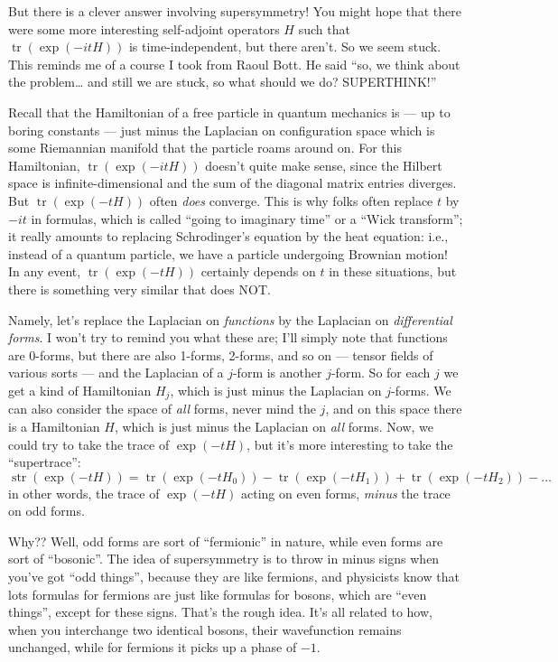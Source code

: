 \documentclass{article}
\begin{document}
But there is a clever answer involving supersymmetry! You might hope
that there were some more interesting self-adjoint operators \(H\) such
that \(\operatorname{tr}(\exp(-itH))\) is time-independent, but there
aren't. So we seem stuck. This reminds me of a course I took from Raoul
Bott. He said ``so, we think about the problem\ldots{} and still we are
stuck, so what should we do? SUPERTHINK!''

Recall that the Hamiltonian of a free particle in quantum mechanics is
--- up to boring constants --- just minus the Laplacian on configuration
space which is some Riemannian manifold that the particle roams around
on. For this Hamiltonian, \(\operatorname{tr}(\exp(-itH))\) doesn't
quite make sense, since the Hilbert space is infinite-dimensional and
the sum of the diagonal matrix entries diverges. But
\(\operatorname{tr}(\exp(-tH))\) often \emph{does} converge. This is why
folks often replace \(t\) by \(-it\) in formulas, which is called
``going to imaginary time'' or a ``Wick transform''; it really amounts
to replacing Schrodinger's equation by the heat equation: i.e., instead
of a quantum particle, we have a particle undergoing Brownian motion! In
any event, \(\operatorname{tr}(\exp(-tH))\) certainly depends on \(t\)
in these situations, but there is something very similar that does NOT.

Namely, let's replace the Laplacian on \emph{functions} by the Laplacian
on \emph{differential forms}. I won't try to remind you what these are;
I'll simply note that functions are 0-forms, but there are also 1-forms,
2-forms, and so on --- tensor fields of various sorts --- and the
Laplacian of a \(j\)-form is another \(j\)-form. So for each \(j\) we
get a kind of Hamiltonian \(H_j\), which is just minus the Laplacian on
\(j\)-forms. We can also consider the space of \emph{all} forms, never
mind the \(j\), and on this space there is a Hamiltonian \(H\), which is
just minus the Laplacian on \emph{all} forms. Now, we could try to take
the trace of \(\exp(-tH)\), but it's more interesting to take the
``supertrace'':
\[\operatorname{str}(\exp(-tH)) = \operatorname{tr}(\exp(-tH_0)) - \operatorname{tr}(\exp(-tH_1)) + \operatorname{tr}(\exp(-tH_2)) - \ldots\]
in other words, the trace of \(\exp(-tH)\) acting on even forms,
\emph{minus} the trace on odd forms.

Why?? Well, odd forms are sort of ``fermionic'' in nature, while even
forms are sort of ``bosonic''. The idea of supersymmetry is to throw in
minus signs when you've got ``odd things'', because they are like
fermions, and physicists know that lots formulas for fermions are just
like formulas for bosons, which are ``even things'', except for these
signs. That's the rough idea. It's all related to how, when you
interchange two identical bosons, their wavefunction remains unchanged,
while for fermions it picks up a phase of \(-1\).
\end{document}
